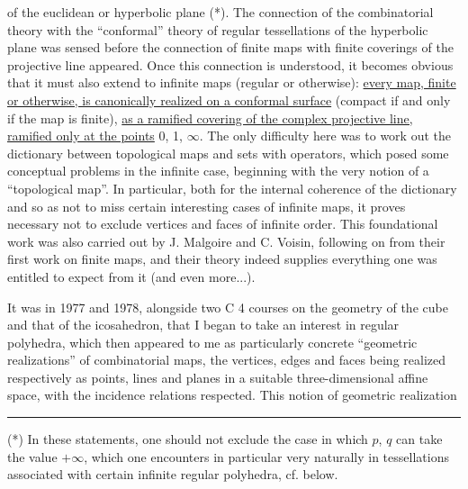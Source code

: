 
of the euclidean or hyperbolic plane (*). The connection
of the combinatorial theory with the ``conformal'' theory of regular
tessellations of the hyperbolic plane was sensed before
the connection of finite maps with finite coverings of the
projective line appeared. Once this connection is understood, it becomes obvious
that it must also extend to infinite maps (regular
or otherwise): \uline{every map, finite or otherwise, is canonically realized on
a conformal surface} (compact if and only if the map is
finite), \uline{as a ramified covering of the complex projective line,
ramified only at the points} 0, 1, $\infty$. The only difficulty
here was to work out the dictionary between topological
maps and sets with operators, which posed some conceptual
problems in the infinite case, beginning with the very notion of
a ``topological map''. In particular, both for the
internal coherence of the dictionary and so as not to miss
certain interesting cases of infinite maps, it proves necessary
not to exclude vertices and faces of infinite order. This foundational
work was also carried out by J. Malgoire and C. Voisin, following
on from their first work on finite maps, and their theory
indeed supplies everything one was entitled to expect from it
(and even more...).

It was in 1977 and 1978, alongside two C 4 courses
on the geometry of the cube and that of the icosahedron, that I
began to take an interest in regular polyhedra, which then appeared
to me as particularly concrete ``geometric realizations''
of combinatorial maps, the vertices, edges and faces being
realized respectively as points, lines and planes
in a suitable three-dimensional affine space, with the incidence
relations respected. This notion of geometric realization

\rule{4cm}{0.4pt}

(*) In these statements, one should not exclude the case in which $p$, $q$
can take the value $+\infty$, which one encounters in particular very
naturally in tessellations associated with certain infinite regular
polyhedra, cf. below.


